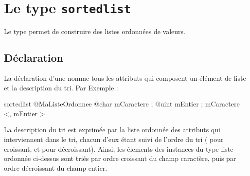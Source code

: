 
\chapter{Le type \texttt{sortedlist}}

Le type  permet de construire des listes ordonnées de valeurs.




\section{Déclaration}

La déclaration d'une  nomme tous les attributs qui composent un élément de liste et la description du tri. Par Exemple :

\begin{galgascode}
sortedlist @MaListeOrdonnee {
  @char mCaractere ;
  @uint mEntier ;
}{
  mCaractere <, mEntier >
}
\end{galgascode}

La description du tri est exprimée par la liste ordonnée des attributs qui interviennent dans le tri, chacun d'eux étant suivi de l'ordre du tri (\galgas{<} pour croissant, et \galgas{>} pour décroissant). Ainsi, les élements des instances du type liste ordonnée ci-dessus sont triés par ordre croissant du champ caractère, puis par ordre décroissant du champ entier.

